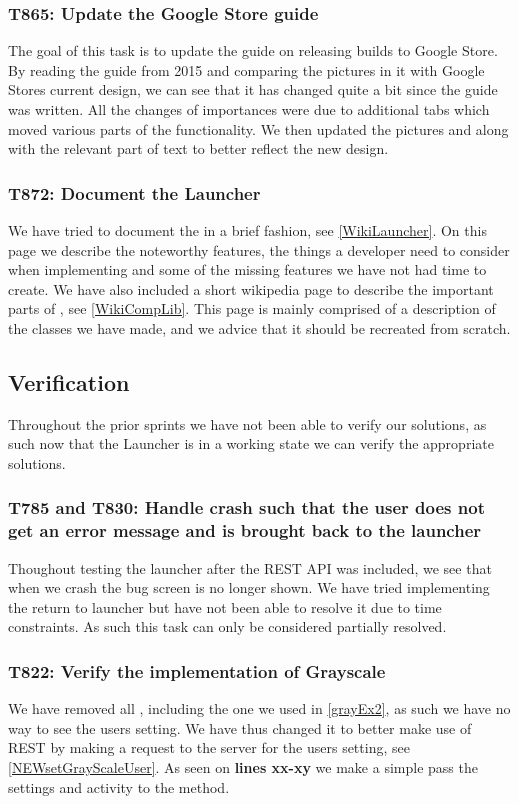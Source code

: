 \subsubsection{T865: Update the Google Store guide}

The goal of this task is to update the guide on releasing builds to Google
Store. By reading the guide from 2015 and comparing the pictures in it with
Google Stores current design, we can see that it has changed quite a bit since
the guide was written. All the changes of importances were due to additional
tabs which moved various parts of the functionality. We then updated the
pictures and along with the relevant part of text to better reflect the new
design.

\subsubsection{T872: Document the Launcher}
We have tried to document the  in a brief fashion, see
\autoref{WikiLauncher}. On this page we describe the noteworthy features, the
things a developer need to consider when implementing  and some of
the missing features we have not had time to create. We have also included a
short wikipedia page to describe the important parts of ,
see \autoref{WikiCompLib}. This page is mainly comprised of a description of the
classes we have made, and we advice that it should be recreated from scratch.

\subsection{Verification}
Throughout the prior sprints we have not been able to verify our solutions, as
such now that the Launcher is in a working state we can verify the appropriate
solutions.

\subsubsection{T785 and T830: Handle crash such that the user does not get an
error message and is brought back to the launcher}
Thoughout testing the launcher after the REST API was included, we see that when
we crash the bug screen is no longer shown. We have tried implementing the
return to launcher but have not been able to resolve it due to time constraints.
As such this task can only be considered partially resolved.

\subsubsection{T822: Verify the implementation of Grayscale}
We have removed all , including the one we used in
\autoref{grayEx2}, as such we have no way to see the users setting. We have thus
changed it to better make use of REST by making a request to the server for the
users setting, see \autoref{NEWsetGrayScaleUser}. As seen on \textbf{lines
xx-xy} we make a simple  pass the settings and activity to the
 method.\nl

